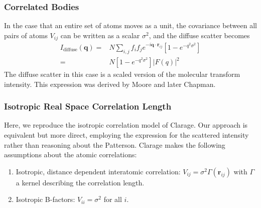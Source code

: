 \documentclass{article}
\begin{document}
\subsubsection{Correlated Bodies}
In the case that an entire set of atoms moves as a unit, the covariance between all pairs of atoms $V_{ij}$ can be written as a scalar $\sigma^2$, and the diffuse scatter becomes
\begin{align}
I_\mathrm{diffuse} (\mathbf{q}) =&
N \sum\limits_{i,j} f_i f_j e^{-i \mathbf{q} \cdot \mathbf{r}_{ij}} 
\left[ 1 - e^{- q^2 \sigma^2} \right] 
\nonumber \\ 
%
=& N \left[ 1 - e^{- q^2 \sigma^2} \right] |F(q)|^2
\end{align}
The diffuse scatter in this case is a scaled version of the molecular transform intensity. This expression was derived by Moore and later Chapman.


\subsubsection{Isotropic Real Space Correlation Length}
Here, we reproduce the isotropic correlation model of Clarage. Our approach is equivalent but more direct, employing the expression for the scattered intensity rather than reasoning about the Patterson. Clarage makes the following assumptions about the atomic correlations:
%
\begin{enumerate}

\item Isotropic, distance dependent interatomic correlation: 
$V_{ij} = \sigma^2 \Gamma(\mathbf{r}_{ij}) $ with $\Gamma$ a kernel describing the correlation length.

\item Isotropic B-factors: $V_{ii} = \sigma^2$ for all $i$.

\end{enumerate}
\end{document}
